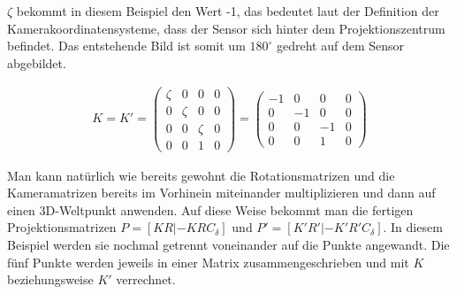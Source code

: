 $\zeta$ bekommt in diesem Beispiel den Wert -1, das bedeutet laut der Definition der Kamerakoordinatensysteme, dass der Sensor sich hinter dem Projektionszentrum befindet. Das entstehende Bild ist somit um \ensuremath{180^\circ} gedreht auf dem Sensor abgebildet.

\begin{gather}
K =	K'=
	\begin{pmatrix}
		\zeta&0&0&0\\
		0&\zeta&0&0\\
		0&0&\zeta&0\\
		0&0&1&0
	\end{pmatrix}=
	\begin{pmatrix}
		-1&0&0&0\\
		0&-1&0&0\\
		0&0&-1&0\\
		0&0&1&0
	\end{pmatrix}
\end{gather}

 Man kann natürlich wie bereits gewohnt die Rotationsmatrizen und die Kameramatrizen bereits im Vorhinein miteinander multiplizieren und dann auf einen 3D-Weltpunkt anwenden. Auf diese Weise bekommt man die fertigen Projektionsmatrizen  $P=[KR|-KRC_\delta]$ und $P'=[K'R'|-K'R'C_\delta]$. In diesem Beispiel werden sie nochmal getrennt voneinander auf die Punkte angewandt. Die fünf Punkte werden jeweils in einer Matrix zusammengeschrieben und mit $K$ beziehungsweise $K'$ verrechnet. 

